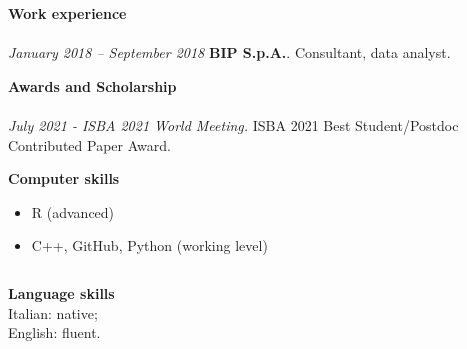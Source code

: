 \documentclass[10pt]{amsart}
\begin{document}
	 
	{\large {\bf Work experience}} \\[-.08cm] 
	\underline{\hspace{6in}} \\[.2cm] 
	{\it January 2018 -- September 2018}\newline
	{\bf BIP S.p.A.}. \newline
	Consultant, data analyst.
	\newline\newline
	
	
 	{\large {\bf Awards and Scholarship}} \\[-.08cm] 
	\underline{\hspace{6in}} \\[.2cm]
	{\it July 2021 - ISBA 2021 World Meeting.}\newline
	ISBA 2021 Best Student/Postdoc Contributed Paper Award.  
	\newline\newline
	
	
	 
	{\large {\bf Computer skills}} \\[-.08cm] 
	\underline{\hspace{6in}} 
	\begin{itemize}
	\item  R (advanced)
	\item  C++, GitHub, Python (working level)
	\end{itemize}
	
	$\,$\newline


	{\large {\bf Language skills}} \\[-.08cm] 
	\underline{\hspace{6in}} \newline
	Italian: native;\\
	English: fluent.  
	\newline
\newline
\newline
	 
\end{document}

